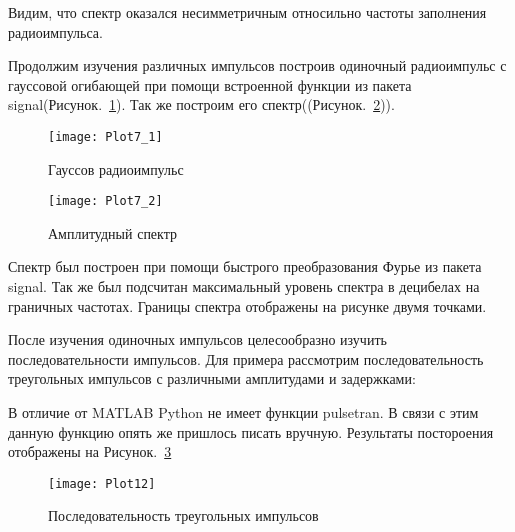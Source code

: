Видим, что спектр оказался несимметричным относильно частоты заполнения радиоимпульса.

Продолжим изучения различных импульсов построив одиночный радиоимпульс с гауссовой огибающей при помощи встроенной функции из пакета signal(Рисунок.~\ref{pic:Plot7_1}). Так же построим его спектр((Рисунок.~\ref{pic:Plot7_2})).



\parindent=1cm %

\begin{figure}[H]
	\begin{center}
		\texttt{[image: Plot7\_1]}
		\caption{Гауссов радиоимпульс} 
		\label{pic:Plot7_1} %
	\end{center}
\end{figure}

\begin{figure}[H]
	\begin{center}
		\texttt{[image: Plot7\_2]}
		\caption{Амплитудный спектр} 
		\label{pic:Plot7_2} %
	\end{center}
\end{figure}

Спектр был построен при помощи быстрого преобразования Фурье из пакета signal. Так же был подсчитан максимальный уровень спектра в децибелах на граничных частотах. Границы спектра отображены на рисунке двумя точками.

После изучения одиночных импульсов целесообразно изучить последовательности импульсов. Для примера рассмотрим последовательность треугольных импульсов с различными амплитудами и задержками:


\parindent=1cm %

В отличие от MATLAB Python не имеет функции pulsetran. В связи с этим данную функцию опять же пришлось писать вручную. Результаты постороения отображены на Рисунок.~\ref{pic:Plot12}

\begin{figure}[H]
	\begin{center}
		\texttt{[image: Plot12]}
		\caption{Последовательность треугольных импульсов} 
		\label{pic:Plot12} %
	\end{center}
\end{figure}

